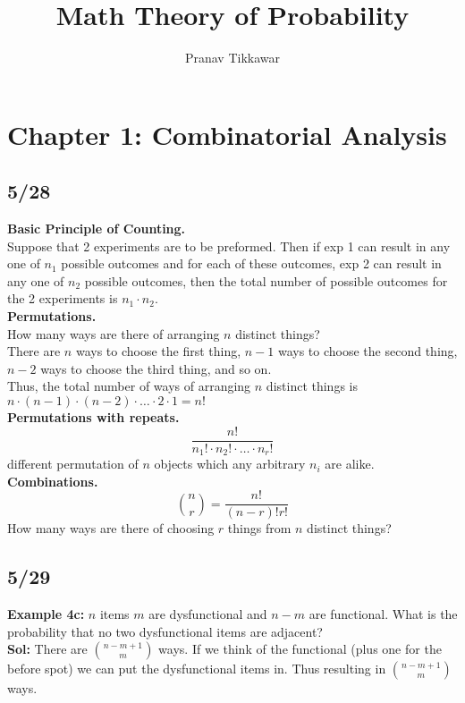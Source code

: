 \documentclass{article}
\author{Pranav Tikkawar}
\title{Math Theory of Probability}
\begin{document}
\maketitle
\tableofcontents
\section{Chapter 1: Combinatorial Analysis}
\subsection*{5/28}
\textbf{Basic Principle of Counting.}\\
Suppose that 2 experiments are to be preformed. Then if exp 1 can result in any one of $n_1$ possible outcomes and for each of these outcomes, exp 2 can result in any one of $n_2$ possible outcomes, then the total number of possible outcomes for the 2 experiments is $n_1 \cdot n_2$.\\

\textbf{Permutations.}\\
How many ways are there of arranging $n$ distinct things?\\
There are $n$ ways to choose the first thing, $n-1$ ways to choose the second thing, $n-2$ ways to choose the third thing, and so on.\\
Thus, the total number of ways of arranging $n$ distinct things is $n \cdot (n-1) \cdot (n-2) \cdot \ldots \cdot 2 \cdot 1 = n!$\\

\textbf{Permutations with repeats.}\\
$$\frac{n!}{n_1! \cdot n_2! \cdot \ldots \cdot n_r!} $$
different permutation of $n$ objects which any arbitrary $n_i$ are alike.\\

\textbf{Combinations.}\\
$$ \binom{n}{r} = \frac{n!}{(n-r)!r!}$$
How many ways are there of choosing $r$ things from $n$ distinct things?

\subsection*{5/29}
\textbf{Example 4c:} $n$ items $m$ are dysfunctional and $n-m$ are functional. What is the probability that no two dysfunctional items are adjacent?\\
\textbf{Sol:} There are $\binom{n-m+1}{m}$ ways. If we think of the functional (plus one for the before spot) we can put the dysfunctional items in. Thus resulting in $\binom{n-m+1}{m}$ ways.\\
\end{document}
